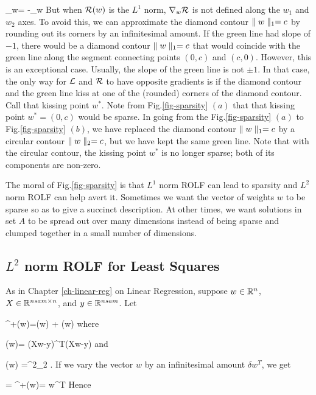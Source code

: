 \beq
\nabla_w\call = -\nabla_w \calr
\eeq
But when ${\cal R}(w)$ is
the $L^1$ norm,  $\nabla_w{\cal R}$ is not defined along the $w_1$
and $w_2$ axes. To avoid this, we can 
approximate the diamond contour $\parallel w\parallel_1=c$
by rounding out its corners
by an infinitesimal amount. If the green line had 
slope of $-1$,
there would be a diamond contour
 $\parallel w\parallel_1=c$ that would coincide with the green line along the 
 segment connecting points $(0,c)$
 and $(c,0)$. However, this is an exceptional case. Usually, the slope
 of the green line is not $\pm 1$.
 In that case, the only way for 
 ${\cal L}$ and ${\cal R}$ to have
 opposite gradients is if the diamond 
 contour and the green line 
 kiss at one of the (rounded)  corners
 of the diamond contour. Call that
 kissing point $w^*$. Note from
 Fig.\ref{fig-sparsity} $(a)$ that that kissing point $w^*=(0,c)$ would be
 sparse. In going from the Fig.\ref{fig-sparsity} $(a)$ to Fig.\ref{fig-sparsity} $(b)$,
 we have replaced the diamond contour
 $\parallel w\parallel_1=c$ by
 a circular contour $\parallel w\parallel_2=c$,
 but we have kept the same green line.
 Note that with the circular contour,
 the kissing point $w^*$ is no longer sparse; both of its components are non-zero.
 
 The moral of Fig.\ref{fig-sparsity}
 is that $L^1$ norm ROLF can lead to sparsity and $L^2$ norm ROLF can help avert it.
 Sometimes we want the vector of weights $w$ to be sparse so as to give
 a succinct description.
 At other times, we want solutions in set $A$ to be spread out over many dimensions instead of being sparse and clumped together in a small number of dimensions.






\subsection{$L^2$ norm ROLF for Least Squares}
As in Chapter \ref{ch-linear-reg} on Linear Regression,
suppose $w\in{ \mathbb{R}}^n$, $X\in { \mathbb{R}}^{nsam\times n}$,
 and  $y\in{ \mathbb{R}}^{nsam} $. Let

\beq
\call^+(w)=\call(w) + \calr(w)
\eeq
where

\beq
\call(w)=
(Xw-y)^T(Xw-y)
\eeq
and

\beq
\calr(w) =\lam{}^2_2
\;.
\eeq
If we vary the  vector $w$ by an
infinitesimal amount $\delta w^T$, we get

= \delta\call^+(w)=
\delta w^T
\eeq
Hence

